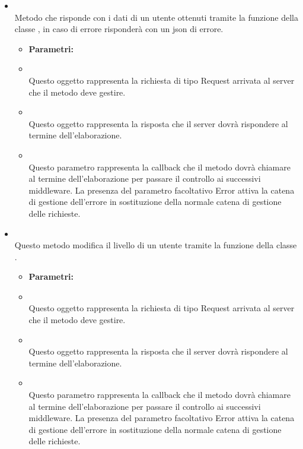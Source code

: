 \begin{itemize}
\begin{itemize}
\end{itemize}
\item[] \textbf{} \\ Metodo che risponde con i dati di un utente ottenuti tramite la funzione  della classe , in caso di errore risponderà con un json di errore.
\begin{itemize}\addtolength{\itemsep}{-0.5\baselineskip}
\item[] \textbf{Parametri:}
\item[]  \\ Questo oggetto rappresenta la richiesta di tipo Request arrivata al server che il metodo deve gestire.
\item[]  \\ Questo oggetto rappresenta la risposta che il server dovrà rispondere al termine dell'elaborazione.
\item[]  \\ Questo parametro rappresenta la callback che il metodo dovrà chiamare al termine dell'elaborazione per passare il controllo ai successivi middleware. La presenza del parametro facoltativo Error attiva la catena di gestione dell'errore in sostituzione della normale catena di gestione delle richieste.
\end{itemize}
\item[] \textbf{} \\ Questo metodo modifica il livello di un utente tramite la funzione  della classe .
\begin{itemize}\addtolength{\itemsep}{-0.5\baselineskip}
\item[] \textbf{Parametri:}
\item[]  \\ Questo oggetto rappresenta la richiesta di tipo Request arrivata al server che il metodo deve gestire.
\item[]  \\ Questo oggetto rappresenta la risposta che il server dovrà rispondere al termine dell'elaborazione.
\item[]  \\ Questo parametro rappresenta la callback che il metodo dovrà chiamare al termine dell'elaborazione per passare il controllo ai successivi middleware. La presenza del parametro facoltativo Error attiva la catena di gestione dell'errore in sostituzione della normale catena di gestione delle richieste.
\end{itemize}
\end{itemize}

